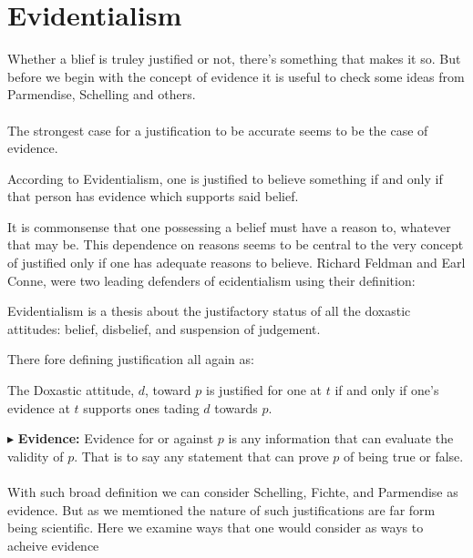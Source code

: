 \documentclass[9pt,a4paper,twocolumn]{article}
\newcounter{def}
\newcommand{\newpoint}[1]{\indent$\blacktriangleright$ \textbf{#1}}
\begin{document}
        \section{Evidentialism} 
            Whether a blief is truley justified or not, there's something that makes it so. But before we begin with the concept of evidence it is useful to check some ideas from Parmendise, Schelling and others.\cite{sep-epistemology}
            \\
            \\
            The strongest case for a justification to be accurate seems to be the case of evidence.
            \begin{define}
                According to Evidentialism, one is justified to believe something if and only if that person has evidence which supports said belief. \cite{enwiki:1149588226}
            \end{define}
            It is commonsense that one possessing a belief must have a reason to, whatever that may be. This dependence on reasons seems to be central to the very concept of justified only if one has adequate reasons to believe. Richard Feldman and Earl Conne, were two leading defenders of ecidentialism using their definition:
            \begin{define}
                Evidentialism is a thesis about the justifactory status of all the doxastic attitudes: belief, disbelief, and suspension of judgement.
            \end{define}
            There fore defining justification all again as:
            \begin{define}
                The Doxastic attitude, $d$, toward $p$ is justified for one at $t$ if and only if one's evidence at $t$ supports ones tading $d$ towards $p$.
            \end{define}
            \newpoint{Evidence:} Evidence for or against $p$ is any information that can evaluate the validity of $p$. That is to say any statement that can prove $p$ of being true or false.\cite{Mittag2015-qc}
            \\
            \\
            With such broad definition we can consider Schelling, Fichte, and Parmendise as evidence. But as we memtioned the nature of such justifications are far form being scientific. Here we examine ways that one would consider as ways  to acheive evidence
            \\
            \\
\end{document}
